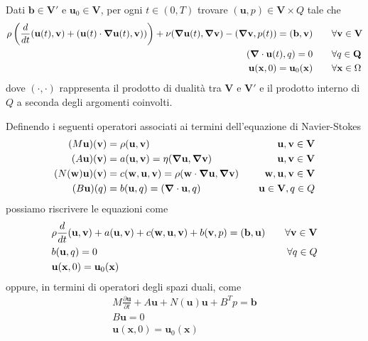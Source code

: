 Dati $\mathbf{b} \in \mathbf{V}'$ e $\mathbf{u}_0 \in \mathbf{V}$, per ogni $t \in (0,T)$ trovare $(\mathbf{u},p) \in \mathbf{V} \times Q$ tale che
\begin{align*}
\rho \left ( \frac{d}{dt}\ps{\mathbf{u}(t)}{\mathbf{v}} + \ps{\mathbf{u}(t)\cdot \Nabla\mathbf{u}(t)}{\mathbf{v})}\right)+ \nu\ps{\Nabla\mathbf{u}(t)}{\Nabla\mathbf{v}}-\ps{\Nabla \mathbf{v}}{p(t)}=\ps{\mathbf{b}}{\mathbf{v}} \qquad & \forall \mathbf{v}\in\mathbf{V} \\
\ps{\Nabla\cdot\mathbf{u}(t)}{q}=0 \qquad & \forall q\in\mathbf{Q} \\
\mathbf{u}(\mathbf{x},0)=\mathbf{u}_0(\mathbf{x}) \qquad & \forall \mathbf{x}\in\Omega
\end{align*}
dove $(\cdot,\cdot)$ rappresenta il prodotto di dualità tra $\mathbf{V}$ e $\mathbf{V}'$ e il prodotto interno di $Q$ a seconda degli argomenti coinvolti.

Definendo i seguenti operatori associati ai termini dell'equazione di Navier-Stokes
\begin{align*}
(M\mathbf{u})(\mathbf{v})&=\rho\ps{\mathbf{u}}{\mathbf{v}} \quad &\mathbf{u},\mathbf{v}\in \mathbf{V}\\
(A\mathbf{u})(\mathbf{v})&=a(\mathbf{u},\mathbf{v})=\eta\ps{\Nabla\mathbf{u}}{\Nabla\mathbf{v}} \quad &\mathbf{u},\mathbf{v}\in \mathbf{V}\\
(N(\mathbf{w})\mathbf{u})(\mathbf{v})&=c(\mathbf{w},\mathbf{u},\mathbf{v})=\rho\ps{\mathbf{w}\cdot\Nabla\mathbf{u}}{\Nabla\mathbf{v}} \quad &\mathbf{w},\mathbf{u},\mathbf{v}\in \mathbf{V}\\
(B\mathbf{u})(q)&=b(\mathbf{u},q)=\ps{\Nabla\cdot\mathbf{u}}{q} \quad &\mathbf{u}\in \mathbf{V},q\in Q
\end{align*}
possiamo riscrivere le equazioni come
\begin{align*}
&\rho\frac{d}{dt}\ps{\mathbf{u}}{\mathbf{v}}+a(\mathbf{u},\mathbf{v})+c(\mathbf{w},\mathbf{u},\mathbf{v})+b(\mathbf{v},p)=\ps{\mathbf{b}}{\mathbf{u}} \quad &\forall\mathbf{v}\in\mathbf{V}\\
&b(\mathbf{u},q)=0 \quad &\forall q\in Q\\
&\mathbf{u}(\mathbf{x},0)=\mathbf{u}_0(\mathbf{x})&
\end{align*}
oppure, in termini di operatori degli spazi duali, come
\begin{align*}
&M\frac{\partial\mathbf{u}}{\partial t}+A\mathbf{u}+N(\mathbf{u})\mathbf{u}+B^{T}p=\mathbf{b}\\
&B\mathbf{u}=0\\
&\mathbf{u}(\mathbf{x},0)=\mathbf{u}_0(\mathbf{x})&
\end{align*}

